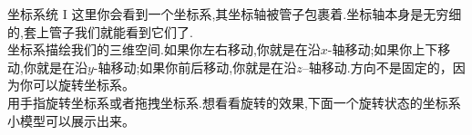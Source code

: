 ﻿\begin{surferPage}{坐标系统 I}
这里你会看到一个坐标系,其坐标轴被管子包裹着.坐标轴本身是无穷细的,套上管子我们就能看到它们了.\\
坐标系描绘我们的三维空间.如果你左右移动,你就是在沿$x$-轴移动;如果你上下移动,你就是在沿$y$-轴移动;如果你前后移动,你就是在沿$z$--轴移动.方向不是固定的，因为你可以旋转坐标系。\\
\vspace{0.3cm}
用手指旋转坐标系或者拖拽坐标系.想看看旋转的效果,下面一个旋转状态的坐标系小模型可以展示出来。
\end{surferPage}
